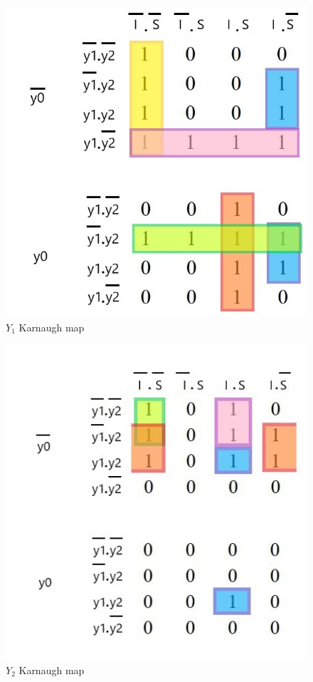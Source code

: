 \documentclass[../../e3_tp3_main.tex]{subfiles}
\begin{document}
\begin{figure}[H]
	\centering
	\includegraphics[scale=0.8]{figures/e3_tp3_ej1_moore_y1_kmap.jpg}
	\caption{$Y_1$ Karnaugh map}
\end{figure}

\begin{figure}[H]
	\centering
	\includegraphics[scale=1]{figures/e3_tp3_ej1_moore_y2_kmap.jpg}
	\caption{$Y_2$ Karnaugh map}
\end{figure}
\end{document}
